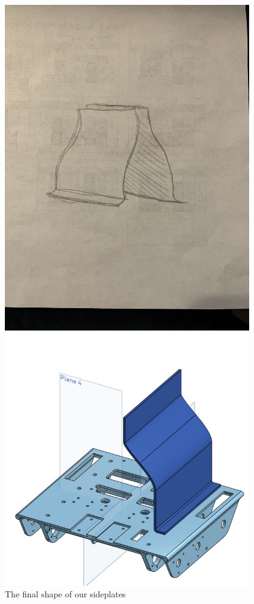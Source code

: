 \begin{figure}[ht]
\centering
\begin{minipage}[b]{.48\textwidth}
  \centering
  \includegraphics[width=0.95\textwidth]{Meetings/November/11-26-21/11-26-21_CAD_Figure3 - Nathan Forrer.JPG}
  \caption{The final shape of our sideplates}
  \label{fig:pic1}
\end{minipage}%
\hfill%
\begin{minipage}[b]{.48\textwidth}
  \centering
  \includegraphics[width=0.95\textwidth]{Meetings/November/11-26-21/11-26-21_CAD_Figure4 - Nathan Forrer.JPG}

\end{minipage}
\end{figure}
